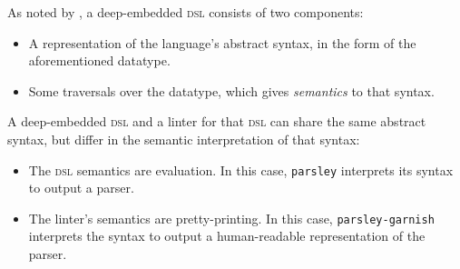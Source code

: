 \documentclass[../../main.tex]{subfiles}
\begin{document}
As noted by \textcite{gibbons_dsls_2014}, a deep-embedded \textsc{dsl} consists of two components:
\begin{itemize}
  \item A representation of the language's abstract syntax, in the form of the aforementioned datatype.
  \item Some traversals over the datatype, which gives \emph{semantics} to that syntax.
\end{itemize}
A deep-embedded \textsc{dsl} and a linter for that \textsc{dsl} can share the same abstract syntax, but differ in the semantic interpretation of that syntax:
\begin{itemize}
  \item The \textsc{dsl} semantics are evaluation. In this case, \texttt{parsley} interprets its syntax to output a parser.
  \item The linter's semantics are pretty-printing. In this case, \texttt{parsley-garnish} interprets the syntax to output a human-readable representation of the parser.
\end{itemize}
\end{document}
